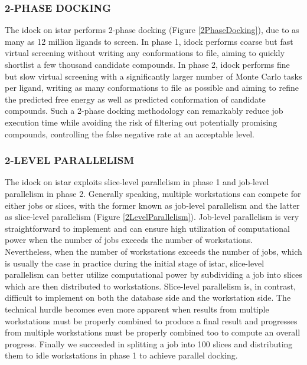 \documentclass[12pt]{article}
\begin{document}
\subsubsection*{\sffamily \normalsize 2-PHASE DOCKING}

The idock on istar performs 2-phase docking (Figure \ref{2PhaseDocking}), due to as many as 12 million ligands to screen. In phase 1, idock performs coarse but fast virtual screening without writing any conformations to file, aiming to quickly shortlist a few thousand candidate compounds. In phase 2, idock performs fine but slow virtual screening with a significantly larger number of Monte Carlo tasks per ligand, writing as many conformations to file as possible and aiming to refine the predicted free energy as well as predicted conformation of candidate compounds. Such a 2-phase docking methodology can remarkably reduce job execution time while avoiding the risk of filtering out potentially promising compounds, controlling the false negative rate at an acceptable level.

\subsubsection*{\sffamily \normalsize 2-LEVEL PARALLELISM}

The idock on istar exploits slice-level parallelism in phase 1 and job-level parallelism in phase 2. Generally speaking, multiple workstations can compete for either jobs or slices, with the former known as job-level parallelism and the latter as slice-level parallelism (Figure \ref{2LevelParallelism}). Job-level parallelism is very straightforward to implement and can ensure high utilization of computational power when the number of jobs exceeds the number of workstations. Nevertheless, when the number of workstations exceeds the number of jobs, which is usually the case in practice during the initial stage of istar, slice-level parallelism can better utilize computational power by subdividing a job into slices which are then distributed to workstations. Slice-level parallelism is, in contrast, difficult to implement on both the database side and the workstation side. The technical hurdle becomes even more apparent when results from multiple workstations must be properly combined to produce a final result and progresses from multiple workstations must be properly combined too to compute an overall progress. Finally we succeeded in splitting a job into 100 slices and distributing them to idle workstations in phase 1 to achieve parallel docking.
\end{document}
